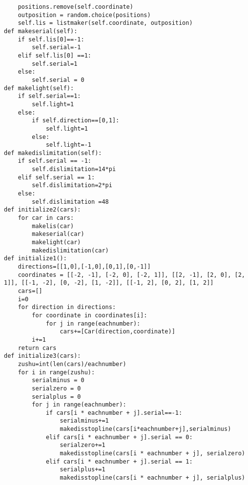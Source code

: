 \documentclass[a4paper,12pt]{article}
\numberwithin{equation}{section}
\begin{document}
\begin{appendix}
\begin{lstlisting}
    positions.remove(self.coordinate)
    outposition = random.choice(positions)
    self.lis = listmaker(self.coordinate, outposition)
def makeserial(self):
    if self.lis[0]==-1:
        self.serial=-1
    elif self.lis[0] ==1:
        self.serial=1
    else:
        self.serial = 0
def makelight(self):
    if self.serial==1:
        self.light=1
    else:
        if self.direction==[0,1]:
            self.light=1
        else:
            self.light=-1
def makedislimitation(self):
    if self.serial == -1:
        self.dislimitation=14*pi
    elif self.serial == 1:
        self.dislimitation=2*pi
    else:
        self.dislimitation =48
def initialize2(cars):
    for car in cars:
        makelis(car)
        makeserial(car)
        makelight(car)
        makedislimitation(car)
def initialize1():
    directions=[[1,0],[-1,0],[0,1],[0,-1]]
    coordinates = [[-2, -1], [-2, 0], [-2, 1]], [[2, -1], [2, 0], [2, 1]], [[-1, -2], [0, -2], [1, -2]], [[-1, 2], [0, 2], [1, 2]]
    cars=[]
    i=0
    for direction in directions:
        for coordinate in coordinates[i]:
            for j in range(eachnumber):
                cars+=[Car(direction,coordinate)]
        i+=1
    return cars
def initialize3(cars):
    zushu=int(len(cars)/eachnumber)
    for i in range(zushu):
        serialminus = 0
        serialzero = 0
        serialplus = 0
        for j in range(eachnumber):
            if cars[i * eachnumber + j].serial==-1:
                serialminus+=1
                makedisstopline(cars[i*eachnumber+j],serialminus)
            elif cars[i * eachnumber + j].serial == 0:
                serialzero+=1
                makedisstopline(cars[i * eachnumber + j], serialzero)
            elif cars[i * eachnumber + j].serial == 1:
                serialplus+=1
                makedisstopline(cars[i * eachnumber + j], serialplus)
	\end{lstlisting}

\end{appendix}
\end{document}
